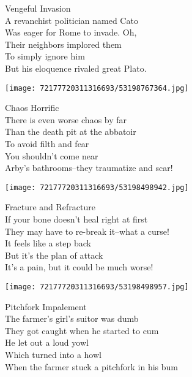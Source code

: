 \documentclass[10pt,letterpaper]{article}
\begin{document}
\begin{center}
Vengeful Invasion\\
\vskip 0.2in
A revanchist politician named Cato\\
Was eager for Rome to invade.  Oh,\\
Their neighbors implored them\\
To simply ignore him\\
But his eloquence rivaled great Plato.\\
\end{center}
\pagebreak

\begin{center}\texttt{[image: 72177720311316693/53198767364.jpg]}
\end{center}
\begin{center}
Chaos Horrific\\
\vskip 0.2in
There is even worse chaos by far\\
Than the death pit at the abbatoir\\
To avoid filth and fear\\
You shouldn't come near\\
Arby's bathrooms--they traumatize and scar!\\
\end{center}
\pagebreak

\begin{center}\texttt{[image: 72177720311316693/53198498942.jpg]}
\end{center}
\begin{center}
Fracture and Refracture\\
\vskip 0.2in
If your bone doesn't heal right at first\\
They may have to re-break it--what a curse!\\
It feels like a step back\\
But it's the plan of attack\\
It's a pain, but it could be much worse!\\
\end{center}
\pagebreak

\begin{center}
\texttt{[image: 72177720311316693/53198498957.jpg]}
\end{center}

\begin{center}
Pitchfork Impalement\\
\vskip 0.2in
The farmer's girl's suitor was dumb\\
They got caught when he started to cum\\
He let out a loud yowl\\
Which turned into a howl\\
When the farmer stuck a pitchfork in his bum\\
\end{center}
\pagebreak
\end{document}
